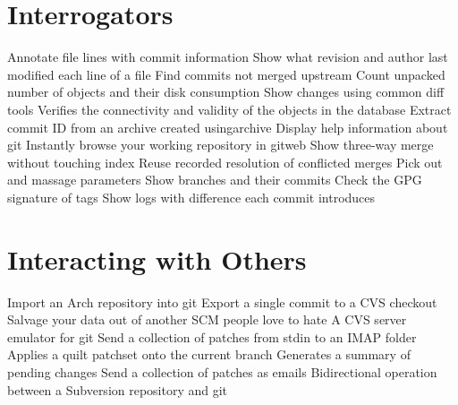 \section{Interrogators}
	{Annotate file lines with commit information}
	{\emergencystretch=5pt Show what revision and author last modified each line of a file}
	{Find commits not merged upstream}
	{Count unpacked number of objects and their disk consumption}
	{Show changes using common diff tools}
	{Verifies the connectivity and validity of the objects in the database}
	{Extract commit ID from an archive created usingarchive}
	{Display help information about git}
	{Instantly browse your working repository in gitweb}
	{Show three-way merge without touching index}
	{Reuse recorded resolution of conflicted merges}
	{Pick out and massage parameters}
	{Show branches and their commits}
	{Check the GPG signature of tags}
	{Show logs with difference each commit introduces}

\section{Interacting with Others}
	{Import an Arch repository into git}
	{Export a single commit to a CVS checkout}
	{Salvage your data out of another SCM people love to hate}
	{A CVS server emulator for git}
	{Send a collection of patches from stdin to an IMAP folder}
	{Applies a quilt patchset onto the current branch}
	{Generates a summary of pending chan\-ges}
	{Send a collection of patches as emails}
	{Bidirectional operation between a Subversion repository and git}

